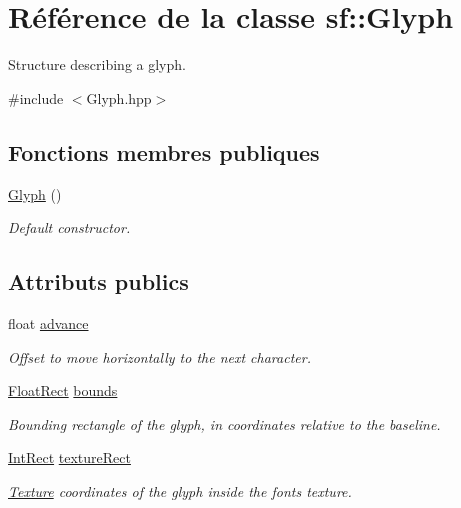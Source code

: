\hypertarget{classsf_1_1Glyph}{}\section{Référence de la classe sf\+:\+:Glyph}
\label{classsf_1_1Glyph}


Structure describing a glyph.  




{\ttfamily \#include $<$Glyph.\+hpp$>$}

\subsection*{Fonctions membres publiques}
\begin{DoxyCompactItemize}
\item 
\mbox{\label{classsf_1_1Glyph_ab15cfc37eb7b40a94b3b3aedf934010b}} 
\hyperlink{classsf_1_1Glyph_ab15cfc37eb7b40a94b3b3aedf934010b}{Glyph} ()
\begin{DoxyCompactList}\small\item\em Default constructor. \end{DoxyCompactList}\end{DoxyCompactItemize}
\subsection*{Attributs publics}
\begin{DoxyCompactItemize}
\item 
\mbox{\label{classsf_1_1Glyph_aeac19b97ec11409147191606b784deda}} 
float \hyperlink{classsf_1_1Glyph_aeac19b97ec11409147191606b784deda}{advance}
\begin{DoxyCompactList}\small\item\em Offset to move horizontally to the next character. \end{DoxyCompactList}\item 
\mbox{\label{classsf_1_1Glyph_a6f3c892093167914adc31e52e5923f4b}} 
\hyperlink{classsf_1_1Rect}{Float\+Rect} \hyperlink{classsf_1_1Glyph_a6f3c892093167914adc31e52e5923f4b}{bounds}
\begin{DoxyCompactList}\small\item\em Bounding rectangle of the glyph, in coordinates relative to the baseline. \end{DoxyCompactList}\item 
\mbox{\label{classsf_1_1Glyph_a0d502d326449f8c49011ed91d2805f5b}} 
\hyperlink{classsf_1_1Rect}{Int\+Rect} \hyperlink{classsf_1_1Glyph_a0d502d326449f8c49011ed91d2805f5b}{texture\+Rect}
\begin{DoxyCompactList}\small\item\em \hyperlink{classsf_1_1Texture}{Texture} coordinates of the glyph inside the font\textquotesingle{}s texture. \end{DoxyCompactList}\end{DoxyCompactItemize}


